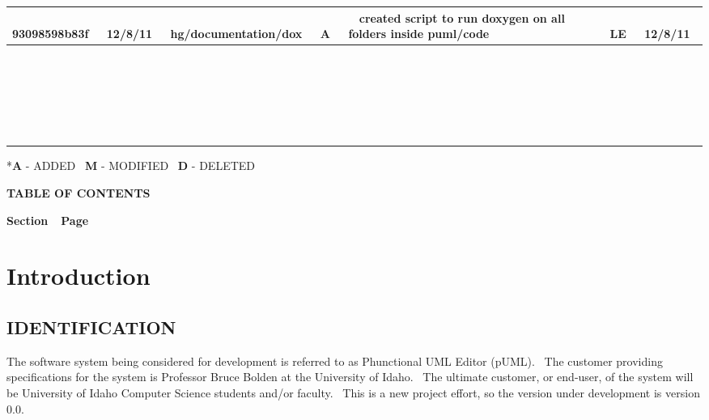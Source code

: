 \documentclass[twoside,letterpaper]{article}
\begin{document}
\begin{flushleft}
\begin{supertabular}{|m{1.0in}|m{0.6in}|p{1.5in}|m{.25in}|m{2.0in}|m{.7in}|m{0.65in}|}
\\\hline
~
93098598b83f &
~
12/8/11 &
~
hg/documentation/dox &
~
A &
~
created script to run doxygen on all folders inside puml/code &
~
LE &
~
12/8/11

\\\hline
~
 &
~
 &
~
 &
~
 &
~
 &
~
 &
~
\\\hline
~
 &
~
 &
~
 &
~
 &
~
 &
~
 &
~
\\\hline
~
 &
~
 &
~
 &
~
 &
~
 &
~
 &
~
\\\hline
~
 &
~
 &
~
 &
~
 &
~
 &
~
 &
~
\\\hline
~
 &
~
 &
~
 &
~
 &
~
 &
~
 &
~
\\\hline
\end{supertabular}
\end{flushleft}

{\color{black}
\foreignlanguage{english}{*}\foreignlanguage{english}{\textbf{A}}\foreignlanguage{english}{
- ADDED
\ }\foreignlanguage{english}{\textbf{M}}\foreignlanguage{english}{ -
MODIFIED
\ }\foreignlanguage{english}{\textbf{D}}\foreignlanguage{english}{ -
DELETED}}


{\centering{}\bfseries\color{black}
TABLE OF CONTENTS
\par}


\bigskip

{\bfseries\color{black}
Section\ \ Page}

\setcounter{tocdepth}{9}
\renewcommand\contentsname{}
\tableofcontents

\bigskip








\clearpage\clearpage\setcounter{page}{1}\pagestyle{Convertii}
\section[Introduction]{\rmfamily\bfseries\color{black}
Introduction}

\subsection[IDENTIFICATION]{\rmfamily\bfseries\color{black}
IDENTIFICATION}
{\color{black}
The software system being considered for development is referred to as Phunctional UML Editor (pUML). \ The customer providing specifications
for the system is Professor Bruce Bolden at the University of Idaho. \ The ultimate
customer, or end-user, of the system will be University of Idaho Computer Science students and/or faculty. \ This is a new project effort, so the version under development is version 0.0.}
\end{document}
